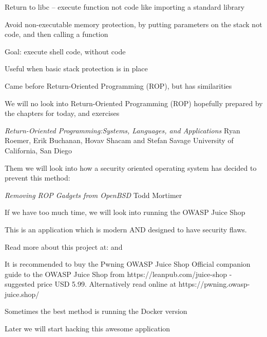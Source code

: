 \documentclass[Screen16to9,17pt]{foils}
\begin{document}
\begin{list1}
\item Return to libc -- execute function not code like importing a standard library
\begin{list2}
\item Avoid non-executable memory protection, by putting parameters on the stack not code, and then calling a function
\item Goal: execute shell code, without code
\end{list2}
\item Useful when basic stack protection is in place
\item Came before Return-Oriented Programming (ROP), but has similarities
\end{list1}




\begin{list1}
\item We will no look into Return-Oriented Programming (ROP) hopefully prepared by the chapters for today, and exercises
\item \emph{Return-Oriented Programming:Systems, Languages, and Applications}
Ryan Roemer, Erik Buchanan, Hovav Shacam and Stefan Savage University of California, San Diego\\
\item Them we will look into how a security oriented operating system has decided to prevent this method:
\item \emph{Removing ROP Gadgets from OpenBSD}
Todd Mortimer\\
\end{list1}


\begin{list1}
\item If we have too much time, we will look into running the OWASP Juice Shop
\item This is an application which is modern AND designed to have security flaws.
\item Read more about this project at:
 and 
\item It is recommended to buy the Pwning OWASP Juice Shop Official companion guide to the OWASP Juice Shop from https://leanpub.com/juice-shop - suggested price USD 5.99. Alternatively read online at https://pwning.owasp-juice.shop/
\item Sometimes the best method is running the Docker version
\end{list1}

\vskip 1cm
\centerline{\large Later we will start hacking this awesome application}




\slidenext{}
\end{document}
